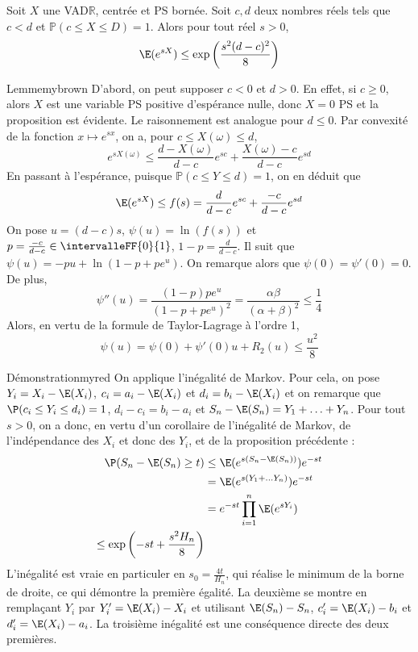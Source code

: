     \begin{lem}{}{}
        Soit $X$ une VAD$\mathbb{R}$, centrée et PS bornée. Soit $c,d$ deux nombres réels tels que $c < d$ et $\mathbb{P}(c \leq X \leq D) = 1$. Alors pour tout réel $s > 0$, 
        \[ \E(e^{sX}) \leq \exp\left(\frac{s^2 (d - c)^2}{8}\right) \]   
    \end{lem}

    \begin{demo}{Lemme}{mybrown}
        D’abord, on peut supposer $c < 0$ et $d > 0$. En effet, si $c \geq 0$, alors $X$ est une variable PS positive d’espérance nulle, donc $X = 0$ PS et la proposition est évidente. Le raisonnement est analogue pour $d \leq 0$. Par convexité de la fonction $x \mapsto e^{sx}$, on a, pour $c \leq X(\omega) \leq d$, 
        \[ e^{s X(\omega)} \leq \frac{d - X(\omega)}{d-c}e^{sc} + \frac{X(\omega) - c}{d-c} e^{sd} \]    
        En passant à l’espérance, puisque $\mathbb{P}(c \leq Y \leq d) = 1$, on en déduit que 
        \[ \E(e^{sX}) \leq f(s) = \frac{d}{d-c}e^{sc} + \frac{-c}{d - c} e^{sd} \]   
        On pose $u = (d-c)s$, $\psi(u) = \ln(f(s))$ et $p = \frac{-c}{d-c} \in \intervalleFF{0}{1}$, $1 - p = \frac{d}{d-c}$. Il suit que $\psi(u) = -pu + \ln(1 - p + pe^u)$. On remarque alors que $\psi(0) = \psi'(0) = 0$. De plus, 
        \[ \psi''(u) = \frac{(1-p)pe^u}{(1 - p + pe^u)^2} = \frac{\alpha \beta}{(\alpha + \beta)^2} \leq \frac{1}{4} \]   
        Alors, en vertu de la formule de Taylor-Lagrage à l’ordre 1, 
        \[ \psi(u) = \psi(0) + \psi'(0)u + R_2(u) \leq \frac{u^2}{8} \]   
    \end{demo}

    \begin{demo}{Démonstration}{myred}
        On applique l’inégalité de Markov. Pour cela, on pose $Y_i = X_i - \E(X_i)$, $c_i = a_i - \E(X_i)$ et $d_i = b_i - \E(X_i)$ et on remarque que $\P(c_i \leq Y_i \leq d_i) = 1$, $d_i - c_i = b_i - a_i$ et $S_n - \E(S_n) = Y_1 + \ldots + Y_n$. Pour tout $s > 0$, on a donc, en vertu d’un corollaire de l’inégalité de Markov, de l’indépendance des $X_i$ et donc des $Y_i$, et de la proposition précédente :
        \begin{align*}
            \P(S_n - \E(S_n) \geq t) 
            &\leq \E(e^{s(S_n - \E(S_n))}) e^{-st} \\
            &= \E(e^{s(Y_1 + \ldots Y_n)}) e^{-st} \\
            &= e^{-st} \prod_{i=1}^n \E(e^{sY_i}) \\
            \leq \exp\left(-st + \frac{s^2 H_n}{8}\right)
        \end{align*}
        L’inégalité est vraie en particuler en $s_0 = \frac{4t}{H_n}$, qui réalise le minimum de la borne de droite, ce qui démontre la première égalité. La deuxième se montre en remplaçant $Y_i$ par $Y'_i = \E(X_i) - X_i$ et utilisant $\E(S_n) - S_n$, $c'_i = \E(X_i) - b_i$ et $d'_i = \E(X_i) - a_i$. La troisième inégalité est une conséquence directe des deux premières.
    \end{demo}

